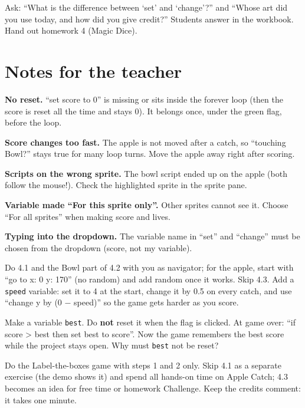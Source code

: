 \begin{reflection}
Ask: \enquote{What is the difference between \enquote{set} and \enquote{change}?} and \enquote{Whose art did you use today, and how did you give credit?} Students answer in the workbook. Hand out homework 4 (Magic Dice).
\end{reflection}

\section{Notes for the teacher}
\begin{commonmistakes}
  \item \textbf{No reset.} \enquote{set score to 0} is missing or sits inside the forever loop (then the score is reset all the time and stays 0). It belongs once, under the green flag, before the loop.
  \item \textbf{Score changes too fast.} The apple is not moved after a catch, so \enquote{touching Bowl?} stays true for many loop turns. Move the apple away right after scoring.
  \item \textbf{Scripts on the wrong sprite.} The bowl script ended up on the apple (both follow the mouse!). Check the highlighted sprite in the sprite pane.
  \item \textbf{Variable made \enquote{For this sprite only}.} Other sprites cannot see it. Choose \enquote{For all sprites} when making score and lives.
  \item \textbf{Typing into the dropdown.} The variable name in \enquote{set} and \enquote{change} must be chosen from the dropdown (score, not my variable).
\end{commonmistakes}

\begin{differentiation}
\supportpath Do 4.1 and the Bowl part of 4.2 with you as navigator; for the apple, start with \enquote{go to x: 0 y: 170} (no random) and add random once it works. Skip 4.3.
\extensionpath Add a \texttt{speed} variable: set it to 4 at the start, change it by 0.5 on every catch, and use \enquote{change y by (0 $-$ speed)} so the game gets harder as you score.
\end{differentiation}

\begin{stretchchallenge}
Make a variable \texttt{best}. Do \textbf{not} reset it when the flag is clicked. At game over: \enquote{if score > best then set best to score}. Now the game remembers the best score while the project stays open. Why must \texttt{best} not be reset?
\end{stretchchallenge}

\begin{teachernote}
Do the Label-the-boxes game with steps 1 and 2 only. Skip 4.1 as a separate exercise (the demo shows it) and spend all hands-on time on Apple Catch; 4.3 becomes an idea for free time or homework Challenge. Keep the credits comment: it takes one minute.
\end{teachernote}
